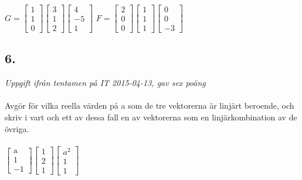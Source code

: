 \documentclass{article}
\begin{document}
\noindent
$G = \begin{bmatrix} 1 \\ 1 \\ 0 \end{bmatrix} \begin{bmatrix} 3 \\ 1 \\ 2 \end{bmatrix} \begin{bmatrix} 4 \\ -5 \\ 1 \end{bmatrix}$ $F = \begin{bmatrix} 2 \\ 0 \\ 0 \end{bmatrix} \begin{bmatrix} 1 \\ 1 \\ 1 \end{bmatrix} \begin{bmatrix} 0 \\ 0 \\ -3 \end{bmatrix}$ 

\subsection*{6.}
\textit{Uppgift ifrån tentamen på IT 2015-04-13, gav sex poäng} \\ \\
Avgör för vilka reella värden på a som de tre vektorerna är linjärt beroende, och skriv i vart och ett av dessa fall en av vektorerna som en linjärkombination av de övriga. \\ \\
\noindent
$\begin{bmatrix} \text{a} \\ 1 \\ -1 \end{bmatrix} \begin{bmatrix} 1 \\ 2 \\ 1 \end{bmatrix} \begin{bmatrix} a^2 \\ 1 \\ 1 \end{bmatrix}$ 
\end{document}
